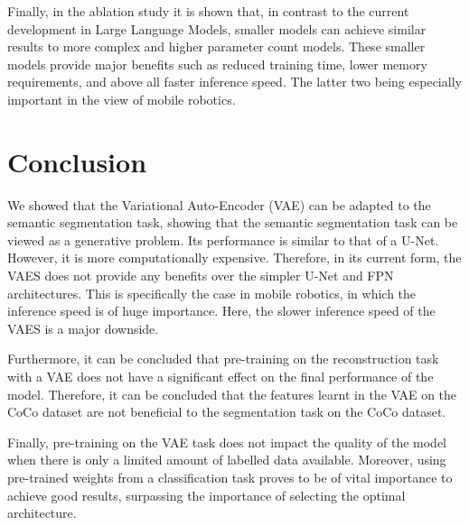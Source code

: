 Finally, in the ablation study it is shown that, in contrast to the current development in Large Language Models, smaller models can achieve similar results to more complex and higher parameter count models. These smaller models provide major benefits such as reduced training time, lower memory requirements, and above all faster inference speed. The latter two being especially important in the view of mobile robotics.


\section{Conclusion}\label{chapter:conclusions}

We showed that the Variational Auto-Encoder (VAE) can be adapted to the semantic segmentation task, showing that the semantic segmentation task can be viewed as a generative problem. Its performance is similar to that of a U-Net. However, it is more computationally expensive. Therefore, in its current form, the VAES does not provide any benefits over the simpler U-Net and FPN architectures. This is specifically the case in mobile robotics, in which the inference speed is of huge importance. Here, the slower inference speed of the VAES is a major downside.

Furthermore, it can be concluded that pre-training on the reconstruction task with a VAE does not have a significant effect on the final performance of the model. Therefore, it can be concluded that the features learnt in the VAE on the CoCo dataset are not beneficial to the segmentation task on the CoCo dataset.

Finally, pre-training on the VAE task does not impact the quality of the model when there is only a limited amount of labelled data available. Moreover, using pre-trained weights from a classification task proves to be of vital importance to achieve good results, surpassing the importance of selecting the optimal architecture.
